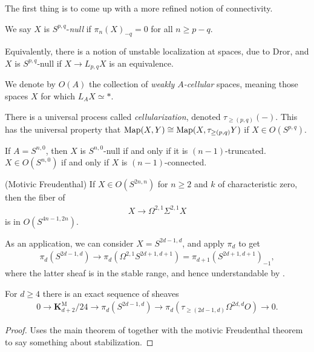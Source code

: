 \documentclass[11pt,openany]{book}
\providecommand{\KM}{\mathbf{K}^\mathrm{M}}
\begin{document}
The first thing is to come up with a more refined notion of connectivity.

\begin{definition} We say $X$ is $S^{p,q}$-\textit{null} if $\pi_n(X)_{-q} = 0$ for all $n \ge p-q$.
\end{definition}

Equivalently, there is a notion of unstable localization at spaces, due to Dror, and $X$ is $S^{p,q}$-null if $X \to L_{p,q}X$ is an equivalence.

\begin{definition} We denote by $O(A)$ the collection of \textit{weakly $A$-cellular} spaces, meaning those spaces $X$ for which $L_A X\simeq \ast$.
\end{definition}

There is a universal process called \textit{cellularization}, denoted $\tau_{\ge(p,q)}(-)$. This has the universal property that $\mathrm{Map}(X,Y) \cong \mathrm{Map}(X,\tau_{\ge(p,q)}Y)$ if $X \in O(S^{p,q})$.


\begin{example} If $A = S^{n,0}$, then $X$ is $S^{n,0}$-null if and only if it is $(n-1)$-truncated. $X \in O(S^{n,0})$ if and only if $X$ is $(n-1)$-connected.
\end{example}

\begin{theorem} (Motivic Freudenthal) If $X \in O(S^{2n,n})$ for $n\ge2$ and $k$ of characteristic zero, then the fiber of
\begin{align*}
    X \to \Omega^{2,1}\Sigma^{2,1}X
\end{align*}
is in $O(S^{4n-1,2n})$.
\end{theorem}

As an application, we can consider $X = S^{2d-1,d}$, and apply $\pi_d$ to get
\begin{align*}
    \pi_d(S^{2d-1,d}) \to \pi_d(\Omega^{2,1}S^{2d+1,d+1}) = \pi_{d+1}(S^{2d+1,d+1})_{-1},
\end{align*}
where the latter sheaf is in the stable range, and hence understandable by \cite{RSO}.

\begin{theorem} \cite[7.2.1]{ABH-Freudenthal} For $d\ge4$ there is an exact sequence of sheaves
\begin{align*}
    0 \to \KM_{d+2}/24 \to \pi_d(S^{2d-1,d}) \to \pi_d(\tau_{\ge(2d-1,d)}\Omega^{2d,d}O) \to 0.
\end{align*}
\end{theorem}
\begin{proof} Uses the main theorem of \cite{RSO} together with the motivic Freudenthal theorem to say something about stabilization.
\end{proof}
\end{document}
